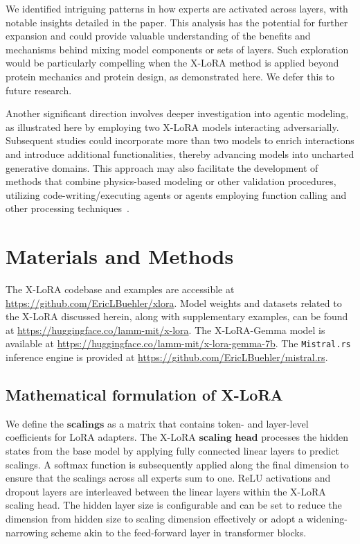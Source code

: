 We identified intriguing patterns in how experts are activated across layers, with notable insights detailed in the paper. This analysis has the potential for further expansion and could provide valuable understanding of the benefits and mechanisms behind mixing model components or sets of layers. Such exploration would be particularly compelling when the X-LoRA method is applied beyond protein mechanics and protein design, as demonstrated here. We defer this to future research.

Another significant direction involves deeper investigation into agentic modeling, as illustrated here by employing two X-LoRA models interacting adversarially. Subsequent studies could incorporate more than two models to enrich interactions and introduce additional functionalities, thereby advancing models into uncharted generative domains. This approach may also facilitate the development of methods that combine physics-based modeling or other validation procedures, utilizing code-writing/executing agents or agents employing function calling and other processing techniques~\cite{Ghafarollahi2024ProtAgents:Learning}.

\section{Materials and Methods}

The X-LoRA codebase and examples are accessible at \url{https://github.com/EricLBuehler/xlora}. Model weights and datasets related to the X-LoRA discussed herein, along with supplementary examples, can be found at \url{https://huggingface.co/lamm-mit/x-lora}. The X-LoRA-Gemma model is available at \url{https://huggingface.co/lamm-mit/x-lora-gemma-7b}. The \texttt{Mistral.rs} inference engine is provided at \url{https://github.com/EricLBuehler/mistral.rs}.

\subsection{Mathematical formulation of X-LoRA} We define the $\mathbf{scalings}$ as a matrix that contains token- and layer-level coefficients for LoRA adapters. The X-LoRA $\mathbf{scaling}$ $\mathbf{head}$ processes the hidden states from the base model by applying fully connected linear layers to predict scalings. A softmax function is subsequently applied along the final dimension to ensure that the scalings across all experts sum to one. ReLU activations and dropout layers are interleaved between the linear layers within the X-LoRA scaling head. The hidden layer size is configurable and can be set to reduce the dimension from hidden size to scaling dimension effectively or adopt a widening-narrowing scheme akin to the feed-forward layer in transformer blocks.

